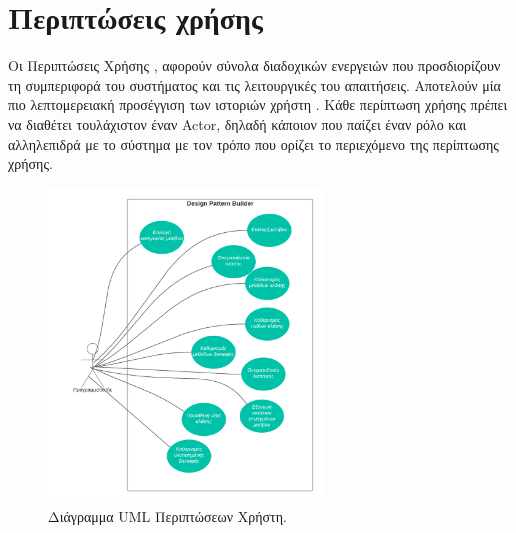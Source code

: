 \section{Περιπτώσεις χρήσης}
Οι Περιπτώσεις Χρήσης \cite{SWEBOK}, αφορούν σύνολα διαδοχικών ενεργειών που προσδιορίζουν τη συμπεριφορά του συστήματος και τις λειτουργικές 
του απαιτήσεις. Αποτελούν μία πιο λεπτομερειακή προσέγγιση των ιστοριών χρήστη \cite{SWEBOK}. 
Κάθε περίπτωση χρήσης πρέπει να διαθέτει τουλάχιστον έναν Actor, δηλαδή κάποιον που παίζει έναν ρόλο και αλληλεπιδρά με το 
σύστημα με τον τρόπο που ορίζει το περιεχόμενο της περίπτωσης χρήσης.
\begin{figure}[H]
	\centering
	\includegraphics[width=0.65\textwidth]{Figures/use_cases.png}
	\caption{Διάγραμμα UML Περιπτώσεων Χρήστη.}
	\label{fig:useCases}
\end{figure}
